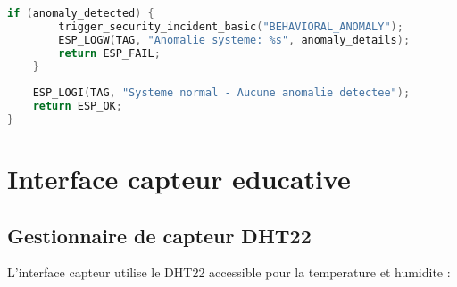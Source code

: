 \begin{lstlisting}[language=C, caption={Detecteur d'anomalies educatif - anomaly\_detector.c}, label=lst:anomaly-detector]
    if (anomaly_detected) {
        trigger_security_incident_basic("BEHAVIORAL_ANOMALY");
        ESP_LOGW(TAG, "Anomalie systeme: %s", anomaly_details);
        return ESP_FAIL;
    }
    
    ESP_LOGI(TAG, "Systeme normal - Aucune anomalie detectee");
    return ESP_OK;
}
\end{lstlisting}

\section{Interface capteur educative}

\subsection{Gestionnaire de capteur DHT22}

L'interface capteur utilise le DHT22 accessible pour la temperature et humidite :

